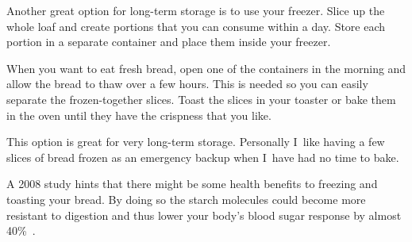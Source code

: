 Another great option for long-term storage is to use
your freezer. Slice up the whole loaf and create portions
that you can consume within a day. Store each portion
in a separate container and place them inside your
freezer.

When you want to eat fresh bread, open one of the containers
in the morning and allow the bread to thaw over a few
hours. This is needed so you can easily separate the frozen-together
slices. Toast the slices in your toaster
or bake them in the oven until they have the crispness
that you like.

This option is great for very long-term storage. Personally
I~like having a few slices of bread frozen as an emergency
backup when I~have had no time to bake.

A 2008 study hints that there might be some health
benefits to freezing and toasting your bread. By doing so
the starch molecules could become more resistant to digestion
and thus lower your body's blood sugar
response by almost 40\%~\cite{freezing+toasting+bread}.
